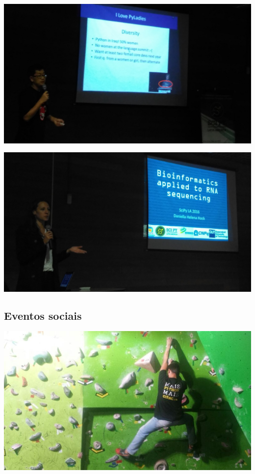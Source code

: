 \documentclass[12pt]{article}
\begin{document}
\noindent  %
\includegraphics[width=\textwidth]{talks-pyladies.jpg}

\noindent  %
\includegraphics[width=\textwidth]{talks-rna.jpg}

\subsection*{Eventos sociais}

\noindent  %
\includegraphics[width=\textwidth]{python-escala.jpg}
\end{document}
